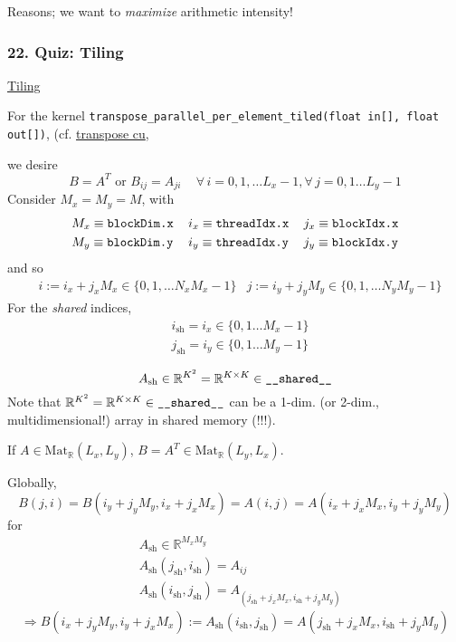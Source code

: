 \documentclass[10pt]{amsart}
\begin{document}
\begin{multicols*}{2}
Reasons; we want to \emph{maximize} arithmetic intensity!  

\subsubsection{22. Quiz: Tiling}

\href{https://classroom.udacity.com/courses/cs344/lessons/109244577/concepts/1113439690923}{Tiling}

For the kernel \verb|transpose_parallel_per_element_tiled(float in[], float out[])|, (cf. \href{https://github.com/ernestyalumni/cs344/blob/master/Lesson%20Code%20Snippets/Lesson%205%20Code%20Snippets/transpose.cu}{transpose cu}, 

we desire
\[
B=A^T \text{ or } B_{ij} = A_{ji} \quad \, \forall \, i = 0,1,\dots L_x -1, \forall \, j = 0,1\dots L_y-1
\]
Consider $M_x=M_y=M$, with 
\[
\begin{aligned}
& M_x \equiv \verb|blockDim.x| \\ 
& M_y \equiv \verb|blockDim.y| 
\end{aligned} \quad \, \begin{aligned}
& i_x \equiv \verb|threadIdx.x| \\ 
& i_y \equiv \verb|threadIdx.y| 
\end{aligned} \quad \, \begin{aligned}
& j_x \equiv \verb|blockIdx.x| \\ 
& j_y \equiv \verb|blockIdx.y| 
\end{aligned}
\]
and so
\[
\begin{aligned}
	& i := i_x + j_x M_x \in \lbrace 0 ,1,\dots N_x M_x-1 \rbrace
	& j := i_y + j_y M_y \in \lbrace 0 ,1,\dots N_y M_y-1 \rbrace
\end{aligned}
\]
For the \emph{shared} indices, 
\[
\begin{aligned}
	& i_{\text{sh}} = i_x \in \lbrace 0 ,1\dots M_x -1 \rbrace   \\
	& j_{\text{sh}} = i_y \in \lbrace 0 ,1\dots M_y -1 \rbrace 
\end{aligned}
\]

\[
A_{\text{sh}} \in \mathbb{R}^{K^2} = \mathbb{R}^{K\times K} \in \verb|__shared__|
\]
Note that $\mathbb{R}^{K^2} = \mathbb{R}^{K\times K} \in \verb|__shared__|$ can be a 1-dim. (or 2-dim., multidimensional!) array in shared memory (!!!).  

If $A\in \text{Mat}_{\mathbb{R}}(L_x,L_y)$, $B=A^T\in \text{Mat}_{\mathbb{R}}(L_y,L_x)$.  

Globally, 
\[
B(j,i)=B(i_y+j_yM_y,i_x+j_xM_x)= A(i,j)=A(i_x+j_xM_x,i_y+j_yM_y)
\]
for 
\[
\begin{aligned}
	& A_{\text{sh}} \in \mathbb{R}^{M_x M_y}   \\ 
	& A_{\text{sh}}(j_{\text{sh}}, i_{\text{sh}}) = A_{ij} \\ 
	& A_{\text{sh}}(i_{\text{sh}},j_{\text{sh}}) = A_(j_{\text{sh}} + j_x M_x, i_{\text{sh}} + j_y M_y) 
\end{aligned}
\]
\[
\Longrightarrow B(i_x + j_y M_y,i_y + j_xM_x) := A_{\text{sh}}(i_{\text{sh}}, j_{\text{sh}} ) = A(j_{\text{sh}} + j_xM_x, i_{\text{sh}} + j_y M_y )
\]



\end{multicols*}
\end{document}
